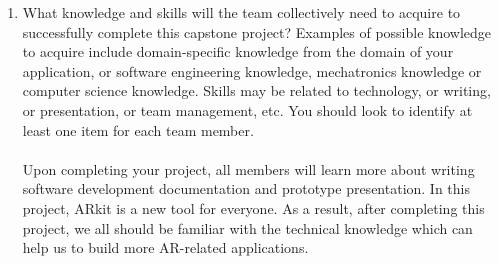 \documentclass[12pt]{article}
\begin{document}
\begin{enumerate}
  \item What knowledge and skills will the team collectively need to acquire to
  successfully complete this capstone project?  Examples of possible knowledge
  to acquire include domain-specific knowledge from the domain of your
  application, or software engineering knowledge, mechatronics knowledge or
  computer science knowledge.  Skills may be related to technology, or writing,
  or presentation, or team management, etc.  You should look to identify at
  least one item for each team member.\\ \\
  Upon completing your project, all members will learn more about writing software development documentation and prototype presentation. In this project, ARkit is a new tool for everyone. As a result, after completing this project, we all should be familiar with the technical knowledge which can help us to build more AR-related applications. 
  

\end{enumerate}
\end{document}
